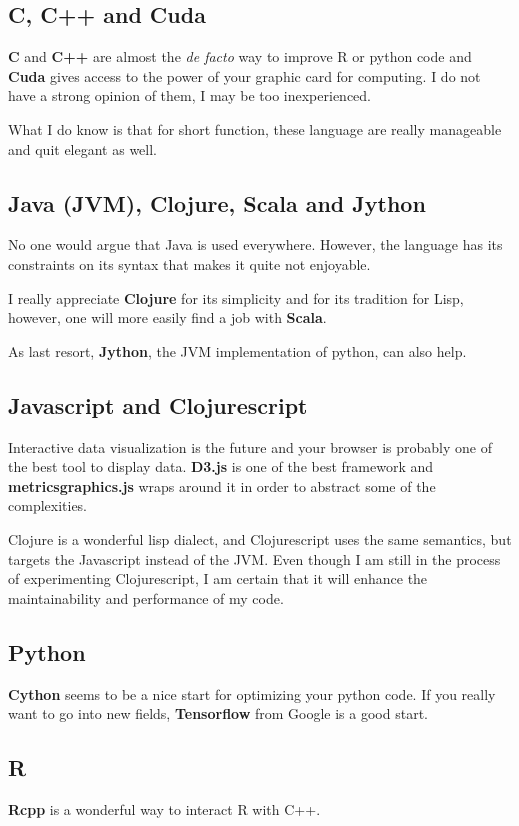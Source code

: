 \documentclass[11pt]{article}
\begin{document}
\subsection{C, C++ and Cuda}
\label{sec:org3c7abdc}
\textbf{C} and \textbf{C++} are almost the \emph{de facto} way to improve R or python code and
\textbf{Cuda} gives access to the power of your graphic card for computing.
I do not have a strong opinion of them, I may be too inexperienced.

What I do know is that for short function, these language are really
manageable and quit elegant as well.

\subsection{Java (JVM), Clojure, Scala and Jython}
\label{sec:orgf4c7e19}
No one would argue that Java is used everywhere. However, the language has
its constraints on its syntax that makes it quite not enjoyable.

I really appreciate \textbf{Clojure} for its simplicity and for its tradition for
Lisp, however, one will more easily find a job with \textbf{Scala}.

As last resort, \textbf{Jython}, the JVM implementation of python, can also help.

\subsection{Javascript and Clojurescript}
\label{sec:org4996a83}
Interactive data visualization is the future and your browser is probably
one of the best tool to display data. \textbf{D3.js} is one of the best framework
and \textbf{metricsgraphics.js} wraps around it in order to abstract some of the
complexities.

Clojure is a wonderful lisp dialect, and Clojurescript uses the same
semantics, but targets the Javascript instead of the JVM. Even though I am
still in the process of experimenting Clojurescript, I am certain that it
will enhance the maintainability and performance of my code.

\subsection{Python}
\label{sec:org25a75c5}
\textbf{Cython} seems to be a nice start for optimizing your python code. If you
really want to go into new fields, \textbf{Tensorflow} from Google is a good start.

\subsection{R}
\label{sec:orge4749c0}
\textbf{Rcpp} is a wonderful way to interact R with C++.
\end{document}
